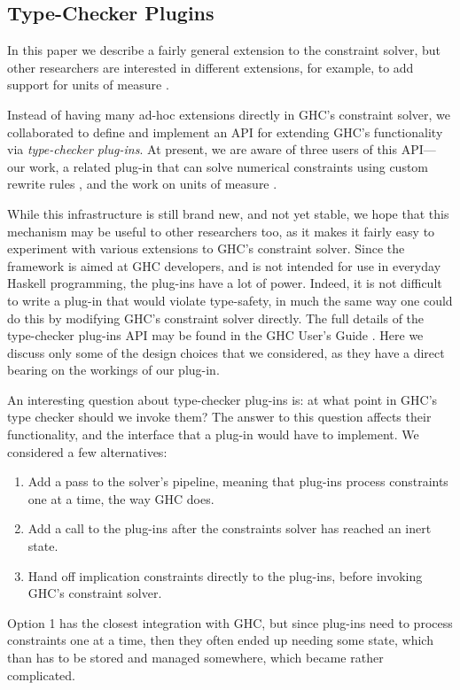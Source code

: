 \documentclass{sigplanconf}
\begin{document}
\subsection{Type-Checker Plugins}
In this paper we describe a fairly general extension to the constraint
solver, but other researchers are interested in different extensions,
for example, to add support for units of measure \cite{units-of-measure}.

Instead of having many ad-hoc extensions directly in GHC's constraint solver,
we collaborated to define and implement an API for extending GHC's
functionality via {\em type-checker plug-ins}.  At present, we are aware
of three users of this API---our work, a related plug-in that can
solve numerical constraints using custom rewrite rules
\cite{typelits-normalise},
and the work on units of measure \cite{units-of-measure}.

While this infrastructure is still brand new, and not yet stable,
we hope that this mechanism may be useful to other researchers too,
as it makes it fairly easy to experiment with various extensions to
GHC's constraint solver.  Since the framework is aimed at GHC developers,
and is not intended for use in everyday Haskell programming, the plug-ins
have a lot of power.  Indeed, it is not difficult to write a plug-in
that would violate type-safety, in much the same way one could do this
by modifying GHC's constraint solver directly.  The full details of
the type-checker plug-ins API may be found in the GHC User's Guide
\cite{ghc-manual}. Here we discuss only some
of the design choices that we considered, as they have a direct
bearing on the workings of our plug-in.

An interesting question about type-checker plug-ins is: at what point in
GHC's type checker should we invoke them?  The answer to this question
affects their functionality, and the interface that a plug-in would have
to implement.  We considered a few alternatives:
\begin{enumerate}
\item Add a pass to the solver's pipeline, meaning that plug-ins process
constraints one at a time, the way GHC does.
\item Add a call to the plug-ins after the constraints solver has reached
an inert state.
\item Hand off implication constraints directly to the plug-ins,
before invoking GHC's constraint solver.
\end{enumerate}

Option 1 has the closest integration with GHC, but since plug-ins need
to process constraints one at a time, then they often ended up needing
some state, which than has to be stored and managed somewhere,
which became rather complicated.
\end{document}
